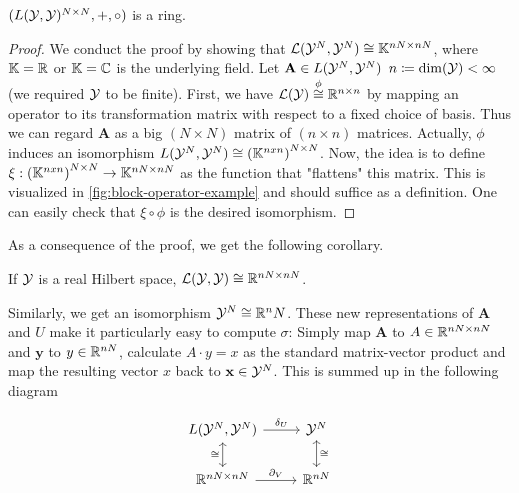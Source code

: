 \begin{theorem}
	\label{theo:product-space-ring}
	$(L(\mathcal{Y}, \mathcal{Y})^{N\times N}, +, \circ)$ is a  ring.
\end{theorem}
\begin{proof}
	We conduct the proof by showing that $\mathcal{L}(\mathcal{Y}^N, \mathcal{Y}^N) \cong \mathbb{K}^{nN \times nN}$, where $\mathbb{K} = \mathbb{R}$ or $\mathbb{K} = \mathbb{C}$ is the underlying field.
	Let $\mathbf{A} \in L(\mathcal{Y}^N, \mathcal{Y}^N)$ $n \coloneqq \mathrm{dim}(\mathcal{Y}) < \infty$ (we required $\mathcal{Y}$ to be finite).
	First, we have $\mathcal{L}(\mathcal{Y}) \stackrel{\phi}{\cong}\mathbb{R}^{n\times n}$ by mapping an operator to its transformation matrix with respect to a fixed choice of basis.
	Thus we can regard $\mathbf{A}$ as a big $(N \times N)$ matrix of $(n \times n)$ matrices.
	Actually, $\phi$ induces an isomorphism $L(\mathcal{Y}^N, \mathcal{Y}^N) \cong \left(\mathbb{K}^{nxn}\right)^{N \times N}$.
	Now, the idea is to define $\xi:\left(\mathbb{K}^{nxn}\right)^{N \times N} \rightarrow \mathbb{K}^{nN \times nN}$ as the function that "flattens" this matrix.
	This is visualized in \cref{fig:block-operator-example} and should suffice as a definition.
	One can easily check that $\xi \circ \phi$ is the desired isomorphism.
\end{proof}



As a consequence of the proof, we get the following corollary.
\begin{corollary}
	\label{cor:matrix-ring-equivalence}
	If $\mathcal{Y}$ is a real Hilbert space, $\mathcal{L}(\mathcal{Y}, \mathcal{Y}) \cong \mathbb{R}^{nN \times nN}$.
\end{corollary}
Similarly, we get an isomorphism $\mathcal{Y}^N \cong \mathbb{R}^nN$.
These new representations of $\mathbf{A}$ and $U$ make it particularly easy to compute $\sigma$:
Simply map $\mathbf{A}$ to $A \in \mathbb{R}^{nN \times nN}$ and $\mathbf{y}$ to $y \in \mathbb{R}^{nN}$, calculate $A \cdot y = x$ as the standard matrix-vector product and map the resulting vector $x$ back to $\mathbf{x} \in\mathcal{Y}^N$.
This is summed up in the following diagram

\begin{corollary}
	\label{cor:matrix-vector-equivalence}
	\begin{equation}
		\begin{tikzcd}
		 	L(\cY^N, \cY^N) \arrow{r}{\delta_U} \arrow[swap, leftrightarrow]{d}{\cong} & \cY^N \arrow[leftrightarrow]{d}{\cong} \\%
			\R^{nN \times nN} \arrow{r}{\partial_V}& \R^{nN}
		\end{tikzcd}
	\end{equation}
\end{corollary}

